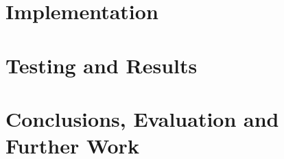 \documentclass[12pt]{ucl_thesis}
\begin{document}
\chapter{Implementation}
\label{chp:impl}



\chapter{Testing and Results}
\label{chp:test&results}



\chapter{Conclusions, Evaluation and Further Work}
\label{chp:conc}





\cleardoublepage
\appendix
%

%




\end{document}

